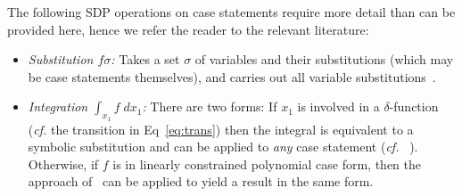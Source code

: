 \documentclass{article} %
\begin{document}
The following SDP operations on case statements require more detail than can be provided here, hence we refer the reader to the relevant literature:
\begin{itemize}
\item 
{\it Substitution $f\sigma$:} Takes a set $\sigma$ of variables and their substitutions (which may be case statements themselves), and carries out all variable substitutions~\cite{sanner_uai11}.
\item 
{\it Integration $\int_{x_1} f \; dx_1$:}  There are two forms: If $x_1$ is involved in a $\delta$-function ({\it cf.} the transition in Eq~\eqref{eq:trans}) then the integral is equivalent to a symbolic substitution and can be applied to \emph{any} case statement ({\it cf.} ~\cite{sanner_uai11}). Otherwise, if $f$ is in linearly constrained polynomial case form, then the approach of~\cite{sanner_aaai12} can be applied to yield a result in the same form.
\end{itemize}
\end{document}
